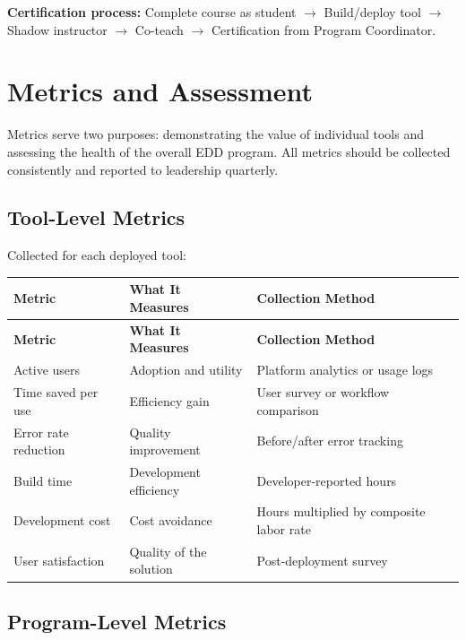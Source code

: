 \documentclass[11pt,letterpaper]{article}
\begin{document}
\textbf{Certification process:} Complete course as student $\rightarrow$ Build/deploy tool $\rightarrow$
Shadow instructor $\rightarrow$ Co-teach $\rightarrow$ Certification from Program Coordinator.

\section{Metrics and Assessment}
\label{sec:metrics-and-assessment}

Metrics serve two purposes: demonstrating the value of individual tools and assessing
the health of the overall EDD program. All metrics should be collected consistently
and reported to leadership quarterly.

\subsection{Tool-Level Metrics}
\label{sec:tool-level-metrics}

Collected for each deployed tool:

\begin{longtable}{@{}p{3.5cm}p{4cm}p{6cm}@{}}
\toprule
\textbf{Metric} & \textbf{What It Measures} & \textbf{Collection Method} \\
\midrule
\endfirsthead
\toprule
\textbf{Metric} & \textbf{What It Measures} & \textbf{Collection Method} \\
\midrule
\endhead
\bottomrule
\endlastfoot
Active users & Adoption and utility & Platform analytics or usage logs \\
\midrule
Time saved per use & Efficiency gain & User survey or workflow comparison \\
\midrule
Error rate reduction & Quality improvement & Before/after error tracking \\
\midrule
Build time & Development efficiency & Developer-reported hours \\
\midrule
Development cost & Cost avoidance & Hours multiplied by composite labor rate \\
\midrule
User satisfaction & Quality of the solution & Post-deployment survey \\
\end{longtable}

\subsection{Program-Level Metrics}
\label{sec:program-level-metrics}
\end{document}
